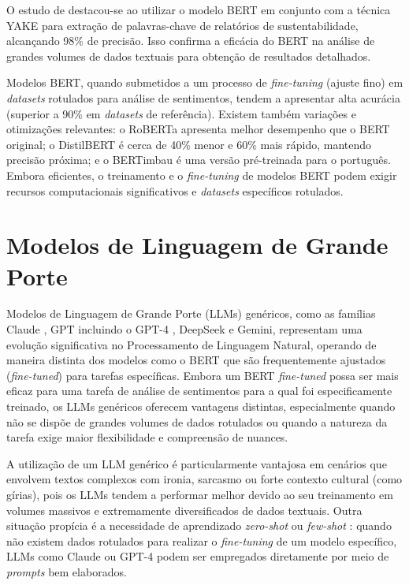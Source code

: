 O estudo de \citeauthor{gupta2024} \citeyear{gupta2024} destacou-se ao utilizar o modelo
BERT em conjunto com a técnica YAKE para extração de palavras-chave de relatórios de
sustentabilidade, alcançando 98\% de precisão. Isso confirma a eficácia do BERT na análise de
grandes volumes de dados textuais para obtenção de resultados detalhados.

Modelos BERT, quando submetidos a um processo de \textit{fine-tuning} (ajuste fino) em
\textit{datasets} rotulados para análise de sentimentos, tendem a apresentar alta acurácia (superior a
90\% em \textit{datasets} de referência). Existem também variações e otimizações relevantes: o RoBERTa
apresenta melhor desempenho que o BERT original; o DistilBERT é cerca de 40\% menor e 60\%
mais rápido, mantendo precisão próxima; e o BERTimbau é uma versão pré-treinada para o
português. Embora eficientes, o treinamento e o \textit{fine-tuning} de modelos BERT podem exigir
recursos computacionais significativos e \textit{datasets} específicos rotulados.

\section{Modelos de Linguagem de Grande Porte}
\label{sec:llms}

Modelos de Linguagem de Grande Porte (\gls{LLM}s) genéricos, como as famílias Claude
\cite{anthropic2024}, \gls{GPT} incluindo o GPT-4 \cite{openai2023gpt4}, DeepSeek
\cite{deepseek2024} e Gemini, representam uma evolução significativa no Processamento de
Linguagem Natural, operando de maneira distinta dos modelos como o BERT que são
frequentemente ajustados (\textit{fine-tuned}) para tarefas específicas. Embora um BERT
\textit{fine-tuned} possa ser mais eficaz para uma tarefa de análise de sentimentos para a qual foi
especificamente treinado, os LLMs genéricos oferecem vantagens distintas, especialmente quando
não se dispõe de grandes volumes de dados rotulados ou quando a natureza da tarefa exige maior
flexibilidade e compreensão de nuances.

A utilização de um LLM genérico é particularmente vantajosa em cenários que envolvem
textos complexos com ironia, sarcasmo ou forte contexto cultural (como gírias), pois os LLMs
tendem a performar melhor devido ao seu treinamento em volumes massivos e extremamente
diversificados de dados textuais. Outra situação propícia é a necessidade de aprendizado
\textit{zero-shot} ou \textit{few-shot} \cite{brown2020}: quando não existem dados rotulados para realizar o
\textit{fine-tuning} de um modelo específico, LLMs como Claude ou GPT-4 podem ser empregados
diretamente por meio de \textit{prompts} bem elaborados.

